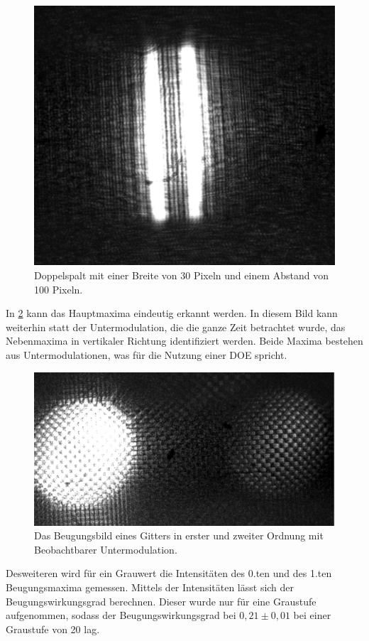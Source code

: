 \begin{figure}[h!]
	\centering
	\includegraphics[scale = 0.7]{doppelspalt.png}
	\caption{Doppelspalt mit einer Breite von 30 Pixeln und einem Abstand von 100 Pixeln.}
	\label{doppel}
\end{figure}

In \cref{gitter} kann das Hauptmaxima eindeutig erkannt werden. In diesem Bild kann weiterhin statt der Untermodulation, die die ganze Zeit betrachtet wurde, das Nebenmaxima in vertikaler Richtung identifiziert werden. Beide Maxima bestehen aus Untermodulationen, was für die Nutzung einer DOE spricht.
\begin{figure}[h!]
	\centering
	\includegraphics[scale = 0.6]{gitter.png}
	\caption{Das Beugungsbild eines Gitters in erster und zweiter Ordnung mit Beobachtbarer Untermodulation.}
	\label{gitter}
\end{figure}
Desweiteren wird für ein Grauwert die Intensitäten des 0.ten und des 1.ten Beugungsmaxima gemessen. Mittels der Intensitäten lässt sich der Beugungswirkungsgrad berechnen. Dieser wurde nur für eine Graustufe aufgenommen, sodass der Beugungswirkungsgrad bei $0,21 \pm 0,01$ bei einer Graustufe von 20 lag.

